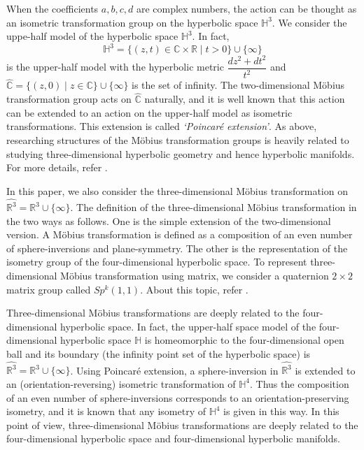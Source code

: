 When the coefficients $a, b, c, d$ are complex numbers, 
the action can be thought as an isometric transformation group on the hyperbolic space $\mathbb{H}^3$.
We consider the uppe-half model of the hyperbolic space $\mathbb{H}^3$.
In fact, 
\[\mathbb{H}^3 = \{ (z,t) \in \mathbb{C}\times \mathbb{R}\mid t>0 \} \cup \{\infty\} \]
is the upper-half model with the hyperbolic metric $\dfrac{dz^2+dt^2}{t^2}$ and 
$\hat{\mathbb{C}} = \{ (z,0) \mid z \in \mathbb{C}\} \cup \{ \infty\}$
is the set of infinity. The two-dimensional M\"obius transformation group acts on $\hat{\mathbb{C}}$
naturally, and it is well known that this action can be extended to 
an action on the upper-half model as isometric transformations.
This extension is called \textit{\lq Poincar\'e extension\rq}.
As above, researching structures of the M\"obius transformation groups is heavily
related to studying three-dimensional hyperbolic geometry and hence hyperbolic manifolds.
For more details, refer 
\cite{Marden200705outerCircles}\cite{taniguchi_okumura199610invitation}.

In this paper, we also consider the three-dimensional M\"obius
transformation on $\hat{\mathbb{R}^3} = \mathbb{R}^3\cup\{\infty\}$.
The definition of the three-dimensional M\"obius transformation in the two ways as follows.
One is the simple extension of the two-dimensional version.
A M\"obius transformation is defined as a composition of an even number of sphere-inversions 
and plane-symmetry.
The other is the representation of the isometry group of the four-dimensional hyperbolic space.
To represent three-dimensional M\"obius transformation using matrix,
we consider a quaternion $2 \times 2$ matrix group called
$Sp^k(1,1)$. About this topic, refer
\cite{sakugawa2010limit}\cite{sakugawa2007master}.

Three-dimensional M\"obius transformations are deeply related to
the four-dimensional hyperbolic space. In fact, the upper-half space model of
the four-dimensional hyperbolic space $\mathbb{H}$ is homeomorphic to the 
four-dimensional open ball and its boundary (the infinity point set of the hyperbolic
space) is $\hat{\mathbb{R}^3} = \mathbb{R}^3\cup\{\infty\}$.
Using Poincar\'e extension, a sphere-inversion in $\hat{\mathbb{R}^3}$
is extended to an (orientation-reversing) isometric transformation of $\mathbb{H}^4$.
Thus the composition of an even number of sphere-inversions corresponds to an orientation-preserving
isometry, and it is known that any isometry of $\mathbb{H}^4$ is given in this way.
In this point of view, three-dimensional M\"obius transformations are
deeply related to the four-dimensional hyperbolic space and four-dimensional hyperbolic manifolds.

